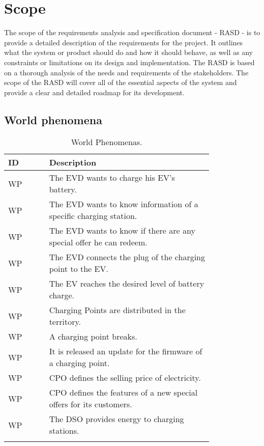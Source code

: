 \section{Scope}
\label{sec:scope}%
The scope of the requirements analysis and specification document - RASD - is to provide a detailed description of the requirements for the project.
It outlines what the system or product should do and how it should behave, as well as any constraints or limitations on its design and implementation.
The RASD is based on a thorough analysis of the needs and requirements of the stakeholders.
The scope of the RASD will cover all of the essential aspects of the system and provide a clear and detailed roadmap for its development.

\subsection{World phenomena}
\label{subsec:world_phenomena}%
\setcounter{wp}{1}
\newcommand{\cwp}{\thewp\stepcounter{wp}}
\begin{center}
    \begin{longtable}{ |l|p{0.8\linewidth}| }
        \hline
        \textbf{ID} & \textbf{Description}                                                \\
        \hline
        WP\cwp      & The EVD wants to charge his EV's battery.                           \\
        \hline
        WP\cwp      & The EVD wants to know information of a specific charging station.   \\
        \hline
        WP\cwp      & The EVD wants to know if there are any special offer he can redeem. \\
        \hline
        WP\cwp      & The EVD connects the plug of the charging point to the EV.          \\
        \hline
        WP\cwp      & The EV reaches the desired level of battery charge.                 \\
        \hline
        WP\cwp      & Charging Points are distributed in the territory.                   \\
        \hline
        WP\cwp      & A charging point breaks.                                            \\
        \hline
        WP\cwp      & It is released an update for the firmware of a charging point.      \\
        \hline
        WP\cwp      & CPO defines the selling price of electricity.                       \\
        \hline
        WP\cwp      & CPO defines the features of a new special offers for its customers. \\
        \hline
        WP\cwp      & The DSO provides energy to charging stations.                       \\
        \hline
        \caption{World Phenomenas.}
        \label{tab:worldph_tab}%
    \end{longtable}
\end{center}

